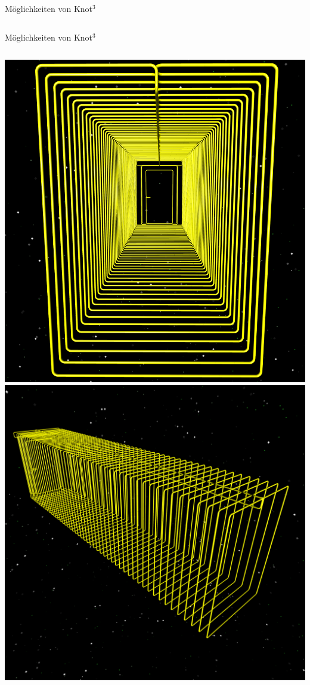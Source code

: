 \documentclass[18pt]{beamer}
\begin{document}
\begin{frame}{Möglichkeiten von Knot$^3$}
\begin{columns}[c]
\end{columns}
\end{frame}

\begin{frame}{Möglichkeiten von Knot$^3$}
\begin{columns}[c]
 \includegraphics[scale=0.205]{raum1}
 \includegraphics[scale=0.20]{raum2}
\end{columns}
\end{frame}
\end{document}
